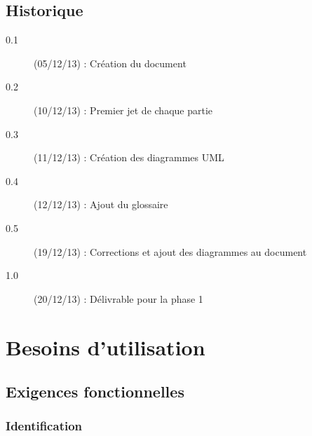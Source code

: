 \documentclass[a4paper]{article}
\begin{document}
\printglossary[numberedsection]
\subsection{Historique}
\begin{description}
\item[0.1] (05/12/13) : Création du document
\item[0.2] (10/12/13) : Premier jet de chaque partie
\item[0.3] (11/12/13) : Création des diagrammes UML
\item[0.4] (12/12/13) : Ajout du glossaire
\item[0.5] (19/12/13) : Corrections et ajout des diagrammes au document
\item[1.0] (20/12/13) : Délivrable pour la phase 1
\end{description}

\section{Besoins d'utilisation}
\subsection{Exigences fonctionnelles}

\subsubsection{Identification}
\end{document}
